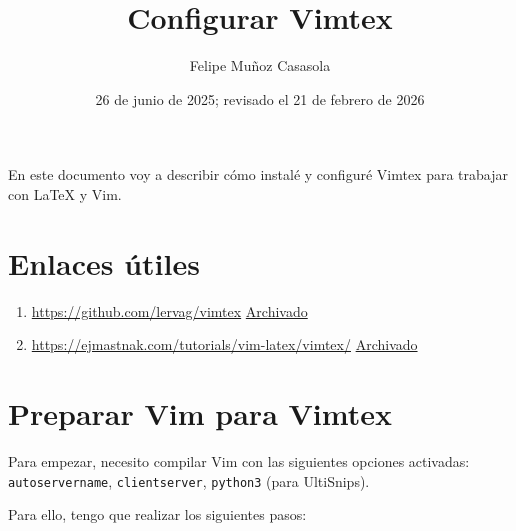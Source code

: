 \documentclass{article}
\title{Configurar Vimtex}
\author{Felipe Muñoz Casasola}
\date{26 de junio de 2025; revisado el 21 de febrero de 2026}
\begin{document}
    \maketitle
    \clearpage
    \tableofcontents
    \clearpage

    En este documento voy a describir cómo instalé y configuré
    Vimtex para trabajar con LaTeX y Vim.

    \section{Enlaces útiles}
    \begin{enumerate}
       \item \href{https://github.com/lervag/vimtex}{https://github.com/lervag/vimtex}
           \subitem \href{https://web.archive.org/web/20250623090325/https://github.com/lervag/vimtex}{Archivado}
       \item \href{https://ejmastnak.com/tutorials/vim-latex/vimtex/}{https://ejmastnak.com/tutorials/vim-latex/vimtex/}
           \subitem \href{https://web.archive.org/web/20250524001805/https://ejmastnak.com/tutorials/vim-latex/vimtex/}{Archivado} 
    \end{enumerate}
    

    \section{Preparar Vim para Vimtex}

    Para empezar, necesito compilar Vim con las siguientes opciones activadas: \texttt{autoservername}, \texttt{clientserver}, \texttt{python3} (para UltiSnips).

    Para ello, tengo que realizar los siguientes pasos:
\end{document}
